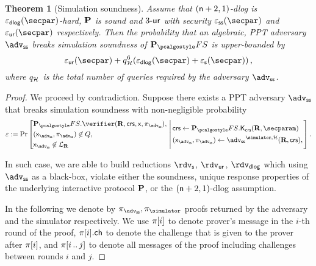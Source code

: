 \documentclass[runningheads,11pt]{llncs}
\newtheorem{theorem}{Theorem}%
\theoremstyle{definition}
\begin{document}
\begin{theorem}[Simulation soundness]
	Assume that $(\mathsf{n} + 2, 1)$-dlog is $\eps_\dlog(\secpar)$-hard, $\mathbf{P}$ is sound and ${3\text{-}\mathsf{ur}}$ with security $\eps_{\ss}(\secpar)$ and $\epsur(\secpar)$ respectively. 
	Then the probability that an algebraic, PPT adversary $\advss$ breaks simulation soundness of $\plonkprotfs$ is upper-bounded by 
	\[
		\epsur(\secpar) + q_\ro^6 (\eps_{\dlog}(\secpar) + \epss(\secpar))\,,
	\]
	where $q_{\mathcal{H}}$ is the total number of queries required by the adversary $\advss$.
\end{theorem}
\begin{proof}
	We proceed by contradiction. Suppose there exists a PPT adversary $\advss$ that breaks simulation soundness with non-negligible probability
	\[
	\eps := \Pr
		\left[
		\begin{aligned}
			& \plonkprotfs.\verifier(\REL, \crs, \inp, \zkproof_{\advss}),\\
			& (\inp_{\advss}, \zkproof_{\advss}) \not\in Q,\\
			& \inp_\advss \not\in \LANG_\REL 
		\end{aligned}
		\,\left|\, 
		\vphantom{\begin{aligned}
			& \plonkprotfs.\verifier(\REL, \crs, \inp, \zkproof_{\advss}),\\
			& (\inp_{\advss}, \zkproof_{\advss}) \not\in Q,\\
			& \inp_\advss \not\in \LANG_\REL 
		\end{aligned}}
		\begin{aligned}
			& \crs \gets \plonkprotfs.\kcrs(\REL, \secparam)\\
			& (\inp_{\advss}, \zkproof_{\advss}) \gets \advss^{\simulator, \ro} (\REL, \crs),		
		\end{aligned}
		\right.\right].
	\]

In such case, we are able to build reductions $\rdvs$, $\rdvur$, $\rdvdlog$ which using $\advss$ as a black-box, violate either the soundness, unique response properties of the underlying interactive protocol $\mathbf{P}$, or the $(\mathsf{n} + 2, 1)$-dlog assumption.

In the following we denote by $\zkproof_{\advss}, \zkproof_{\simulator}$ proofs
returned by the adversary and the simulator respectively. We use $\pi[i]$
to denote prover's message in the $i$-th round of the proof, $\pi[i].\mathsf{ch}$
to denote the challenge that is given to the prover after $\pi[i]$, and
$\pi[i \, .. \, j]$ to denote all messages of the proof including challenges between rounds $i$ and $j$.


\end{proof}
\end{document}
